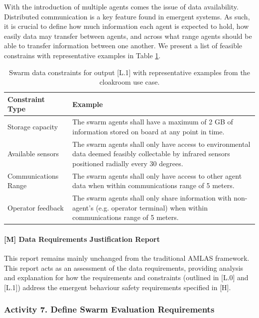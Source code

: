 \documentclass[lettersize,journal]{IEEEtran}
\begin{document}
With the introduction of multiple agents comes the issue of data availability. Distributed communication is a key feature found in emergent systems. As such, it is crucial to define how much information each agent is expected to hold, how easily data may transfer between agents, and across what range agents should be able to transfer information between one another. We present a list of feasible constrains with representative examples in Table \ref{tab:constraints}.

\begin{table}[!t]%
    \centering
    \begin{tabular}{p{2cm} p{6cm}}
         \textbf{Constraint Type} & \textbf{Example}  \\
         \hline
         Storage capacity & The swarm agents shall have a maximum of 2 GB of information stored on board at any point in time. \\
         \hline
         Available sensors & The swarm agents shall only have access to environmental data deemed feasibly collectable by infrared sensors positioned radially every 30 degrees. \\
         \hline
         Communications Range & The swarm agents shall only have access to other agent data when within communications range of 5 meters. \\
         \hline
         Operator feedback & The swarm agents shall only share information with non-agent’s (e.g. operator terminal) when within communications range of 5 meters.
    \end{tabular}
    \caption{Swarm data constraints for output [L.1] with representative examples from the cloakroom use case.}
    \label{tab:constraints}
\end{table}

\paragraph*{[M] Data Requirements Justification Report}

This report remains mainly unchanged from the traditional AMLAS framework. This report acts as an assessment of the data requirements, providing analysis and explanation for how the requirements and constraints (outlined in [L.0] and [L.1]) address the emergent behaviour safety requirements specified in [H].

\subsubsection*{Activity 7. Define Swarm Evaluation Requirements}
\end{document}
